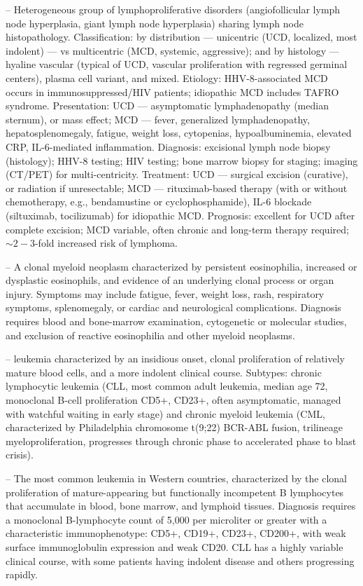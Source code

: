 -- Heterogeneous group of lymphoproliferative disorders (angiofollicular lymph node hyperplasia, giant lymph node hyperplasia) sharing lymph node histopathology. Classification: by distribution — unicentric (UCD, localized, most indolent) — vs multicentric (MCD, systemic, aggressive); and by histology — hyaline vascular (typical of UCD, vascular proliferation with regressed germinal centers), plasma cell variant, and mixed. Etiology: HHV-8-associated MCD occurs in immunosuppressed/HIV patients; idiopathic MCD includes TAFRO syndrome. Presentation: UCD — asymptomatic lymphadenopathy (median sternum), or mass effect; MCD — fever, generalized lymphadenopathy, hepatosplenomegaly, fatigue, weight loss, cytopenias, hypoalbuminemia, elevated CRP, IL-6-mediated inflammation. Diagnosis: excisional lymph node biopsy (histology); HHV-8 testing; HIV testing; bone marrow biopsy for staging; imaging (CT/PET) for multi-centricity. Treatment: UCD — surgical excision (curative), or radiation if unresectable; MCD — rituximab-based therapy (with or without chemotherapy, e.g., bendamustine or cyclophosphamide), IL-6 blockade (siltuximab, tocilizumab) for idiopathic MCD. Prognosis: excellent for UCD after complete excision; MCD variable, often chronic and long-term therapy required; $\sim 2-3$-fold increased risk of lymphoma.

-- A clonal myeloid neoplasm characterized by persistent eosinophilia, increased or dysplastic eosinophils, and evidence of an underlying clonal process or organ injury. Symptoms may include fatigue, fever, weight loss, rash, respiratory symptoms, splenomegaly, or cardiac and neurological complications. Diagnosis requires blood and bone-marrow examination, cytogenetic or molecular studies, and exclusion of reactive eosinophilia and other myeloid neoplasms.

-- leukemia characterized by an insidious onset, clonal proliferation of relatively mature blood cells, and a more indolent clinical course. Subtypes: chronic lymphocytic leukemia (CLL, most common adult leukemia, median age 72, monoclonal B-cell proliferation CD5+, CD23+, often asymptomatic, managed with watchful waiting in early stage) and chronic myeloid leukemia (CML, characterized by Philadelphia chromosome t(9;22) BCR-ABL fusion, trilineage myeloproliferation, progresses through chronic phase to accelerated phase to blast crisis).

-- The most common leukemia in Western countries, characterized by the clonal proliferation of mature-appearing but functionally incompetent B lymphocytes that accumulate in blood, bone marrow, and lymphoid tissues. Diagnosis requires a monoclonal B-lymphocyte count of 5,000 per microliter or greater with a characteristic immunophenotype: CD5+, CD19+, CD23+, CD200+, with weak surface immunoglobulin expression and weak CD20. CLL has a highly variable clinical course, with some patients having indolent disease and others progressing rapidly.

